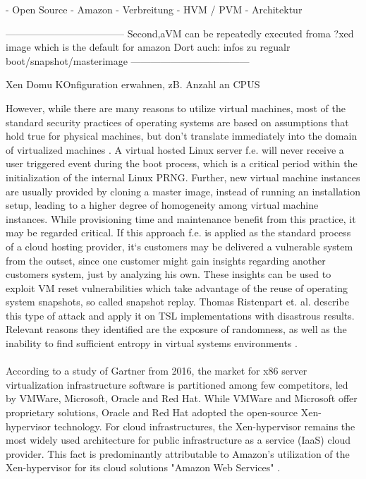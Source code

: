 - Open Source
- Amazon
- Verbreitung 
- HVM / PVM
- Architektur

------------------------------------
\cite{everspaugh2014not}
Second,aVM  can be repeatedly executed froma ?xed image which is the default for amazon
Dort auch: infos zu regualr boot/snapshot/masterimage
------------------------------------

Xen Domu KOnfiguration erwahnen, zB. Anzahl an CPUS

However, while there are many reasons to utilize virtual machines, most of the standard security practices of operating systems are based on assumptions that hold true for physical machines, but don't translate immediately into the domain of virtualized machines \cite{kerrigan2012study}. A virtual hosted Linux server f.e. will never receive a user triggered event during the boot process, which is a critical period within the initialization of the internal Linux PRNG. Further, new virtual machine instances are usually provided by cloning a master image, instead of running an installation setup, leading to a higher degree of homogeneity among virtual machine instances. While provisioning time and maintenance benefit from this practice, it may be regarded critical. If this approach f.e. is applied as the standard process of a cloud hosting provider, it`s customers may be delivered a vulnerable system from the outset, since one customer might gain insights regarding another customers system, just by analyzing his own. These insights can be used to exploit VM reset vulnerabilities which take advantage of the reuse of  operating system snapshots, so called snapshot replay. Thomas Ristenpart et. al. describe this type of attack and apply it on TSL implementations with disastrous results. Relevant reasons they identified are the exposure of randomness, as well as the inability to find sufficient entropy in virtual systems environments \cite{ristenpart2010good, ristenpart2009hey}. \\~\\
According to a study of Gartner from 2016, the market for x86 server virtualization infrastructure software is partitioned among few competitors, led by VMWare, Microsoft, Oracle and Red Hat. While VMWare and Microsoft offer proprietary solutions, Oracle and Red Hat adopted the open-source Xen-hypervisor technology. For cloud infrastructures, the Xen-hypervisor remains the most widely used architecture for public infrastructure as a service (IaaS) cloud provider. This fact is predominantly attributable to Amazon's utilization of the Xen-hypervisor for its cloud solutions "Amazon Web Services" \cite{bittman2016magic}. 


